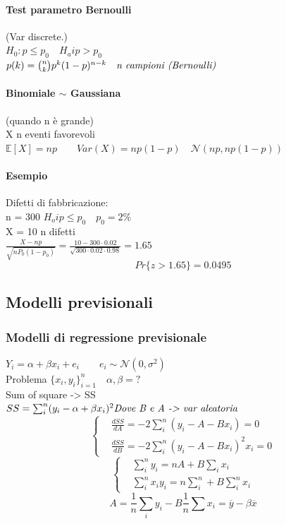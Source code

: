 \documentclass[]{article}
\newcommand{\ev}{\mathbb{E}[X]}
\renewcommand{\ev}[1]{\mathbb{E}[#1]}
\begin{document}
    \paragraph{Test parametro Bernoulli} (Var discrete.) \\
    $H_0 : p \leq p_0 \quad H_a i p > p_0$ \\[2ex]
    $p(k) = \binom{n}{k} p^k (1-p)^{n-k} \quad \text{\textit{n campioni (Bernoulli)}}$ \\[4ex]
    \paragraph{Binomiale $\sim$ Gaussiana} (quando n è grande) \\
    X n eventi favorevoli \\
    $\ev{X} = np \qquad Var(X) = np(1-p) \quad \mathcal{N}(np, np(1-p))$
    \paragraph{Esempio} Difetti di fabbricazione: \\
    n = 300 $H_o i p \leq p_0 \quad p_0 = 2\%$ \\
    X = 10 n difetti \\[2ex]
    $\displaystyle\frac{X-np}{\sqrt{nP_0(1-p_0)}} = \frac{10-300 \cdot 0.02}{\sqrt{300 \cdot 0.02 \cdot 0.98}} = 1.65$
    \[ Pr \{ z > 1.65 \} = 0.0495 \]
    \subsection{Modelli previsionali}
    \subsubsection{Modelli di regressione previsionale}
    $Y_i = \alpha + \beta x_i + e_i  \qquad e_i \sim \mathcal{N}(0, \sigma^2)$ \\[4ex]
    Problema $\{ x_i, y_i \}^n_{i=1} \quad \alpha, \beta = ?$ \\[4ex]
    Sum of square -> SS \\
    $SS = \sum_{i}^{n} (y_i - \alpha + \beta x_i)^2 \text{\textit{Dove B e A -> var aleatoria}}$ \\[2ex]
    \begin{equation*}
        \begin{cases}
            & \displaystyle\frac{dSS}{dA} = -2 \sum_{i}^{n} (y_i - A - Bx_i) = 0 \\
            & \displaystyle\frac{dSS}{dB} = -2 \sum_{i}^{n} (y_i - A - Bx_i)^2x_i = 0
        \end{cases} 
    \end{equation*}
    \begin{equation*}
        \begin{cases}
            & \displaystyle\sum_{i}^{n} y_i = nA + B \sum_{i}^{} x_i \\
            & \displaystyle\sum_{i}^{n} x_i y_i = n \sum_{i}^{n} + B \sum_{i}^{n} x_i
        \end{cases} 
    \end{equation*}
    \[ A = \frac{1}{n} \sum_{i}^{} y_i - B\frac{1}{n} \sum_{}^{} x_i = \overline{y} - \beta \overline{x} \]
\end{document}
